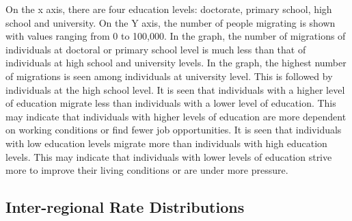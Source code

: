 \documentclass[
  11pt,
  a4paper,
  DIV=11,
  numbers=noendperiod]{scrartcl}
\begin{document}
On the x axis, there are four education levels: doctorate, primary
school, high school and university. On the Y axis, the number of people
migrating is shown with values ranging from 0 to 100,000. In the graph,
the number of migrations of individuals at doctoral or primary school
level is much less than that of individuals at high school and
university levels. In the graph, the highest number of migrations is
seen among individuals at university level. This is followed by
individuals at the high school level. It is seen that individuals with a
higher level of education migrate less than individuals with a lower
level of education. This may indicate that individuals with higher
levels of education are more dependent on working conditions or find
fewer job opportunities. It is seen that individuals with low education
levels migrate more than individuals with high education levels. This
may indicate that individuals with lower levels of education strive more
to improve their living conditions or are under more pressure.

\hypertarget{inter-regional-rate-distributions}{%
\subsection{Inter-regional Rate
Distributions}\label{inter-regional-rate-distributions}}
\end{document}
